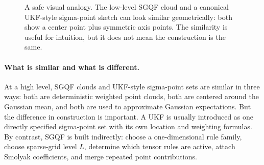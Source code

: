 \documentclass[11pt]{article}
\numberwithin{equation}{section}
\begin{document}
\begin{figure}[htbp]
\centering
{}
\caption{A safe visual analogy.  The low-level SGQF cloud and a canonical
UKF-style sigma-point sketch can look similar geometrically: both show a center
point plus symmetric axis points.  The similarity is useful for intuition, but it
does not mean the construction is the same.}
\label{fig:p42-sgqf-vs-ukf-2d}
\end{figure}

\paragraph{What is similar and what is different.}
At a high level, SGQF clouds and UKF-style sigma-point sets are similar in three
ways: both are deterministic weighted point clouds, both are centered around the
Gaussian mean, and both are used to approximate Gaussian expectations.  But the
difference in construction is important.  A UKF is usually introduced as one
directly specified sigma-point set with its own location and weighting formulas.
By contrast, SGQF is built indirectly: choose a one-dimensional rule family,
choose sparse-grid level \(L\), determine which tensor rules are active, attach
Smolyak coefficients, and merge repeated point contributions.
\end{document}
